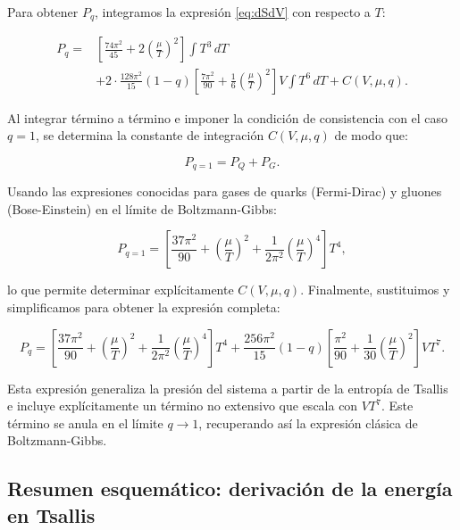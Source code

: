 Para obtener \( P_q \), integramos la expresión \eqref{eq:dSdV} con respecto a \( T \):

\begin{equation}
\begin{split}
P_q = & \left[ \frac{74\pi^2}{45} + 2\left( \frac{\mu}{T} \right)^2 \right] \int T^3 \, dT \\
& + 2 \cdot \frac{128\pi^2}{15}(1-q) \left[ \frac{7\pi^2}{90} + \frac{1}{6} \left( \frac{\mu}{T} \right)^2 \right] V \int T^6 \, dT + C(V, \mu, q).
\end{split}
\end{equation}

Al integrar término a término e imponer la condición de consistencia con el caso \( q = 1 \), se determina la constante de integración \( C(V, \mu, q) \) de modo que:

\[
P_{q=1} = P_Q + P_G.
\]

Usando las expresiones conocidas para gases de quarks (Fermi-Dirac) y gluones (Bose-Einstein) en el límite de Boltzmann-Gibbs:

\begin{equation}
P_{q=1} = \left[\frac{37\pi^2}{90} + \left(\frac{\mu}{T} \right)^2 + \frac{1}{2\pi^2} \left(\frac{\mu}{T} \right)^4 \right] T^4,
\end{equation}

lo que permite determinar explícitamente \( C(V, \mu, q) \). Finalmente, sustituimos y simplificamos para obtener la expresión completa:

\begin{equation}\label{eq:FinalTsallisPressureAppendix}
P_q = \left[ \frac{37\pi^2}{90} + \left( \frac{\mu}{T} \right)^2 + \frac{1}{2\pi^2} \left( \frac{\mu}{T} \right)^4 \right] T^4 + \frac{256\pi^2}{15}(1-q) \left[ \frac{\pi^2}{90} + \frac{1}{30} \left( \frac{\mu}{T} \right)^2 \right] V T^7.
\end{equation}

Esta expresión generaliza la presión del sistema a partir de la entropía de Tsallis e incluye explícitamente un término no extensivo que escala con \( V T^7 \). Este término se anula en el límite \( q \to 1 \), recuperando así la expresión clásica de Boltzmann-Gibbs.

\subsection*{Resumen esquemático: derivación de la energía en Tsallis} \label{app:flow}

